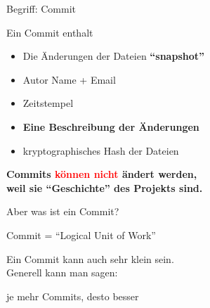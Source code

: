 \documentclass[xetex, handout]{beamer}
\begin{document}
\begin{frame}{Begriff: Commit}
    \begin{block}{Ein Commit enthalt}
    \begin{itemize}
        \item Die \"Anderungen der Dateien \textbf{``snapshot''} \pause
        \item Autor Name + Email \pause
        \item Zeitstempel \pause
        \item \textbf{Eine Beschreibung der \"Anderungen} \pause
        \item kryptographisches Hash der Dateien
    \end{itemize}
    \end{block}

    \pause
  \begin{center}
  \textbf{
    Commits \textcolor{red}{k\"onnen nicht} \"andert werden, \\
      weil sie ``Geschichte'' des Projekts sind.
  }
    \end{center}
\end{frame}


\begin{frame}[c]{Aber was ist ein Commit?}
  \begin{center}
  {\LARGE
    Commit = ``Logical Unit of Work''
  }

  \vspace{2em}
  Ein Commit kann auch sehr klein sein. \\
  Generell kann man sagen: 
  \vspace{2em}

  {\LARGE
    je mehr Commits, desto besser
  }
  \end{center}
\end{frame}
\end{document}
